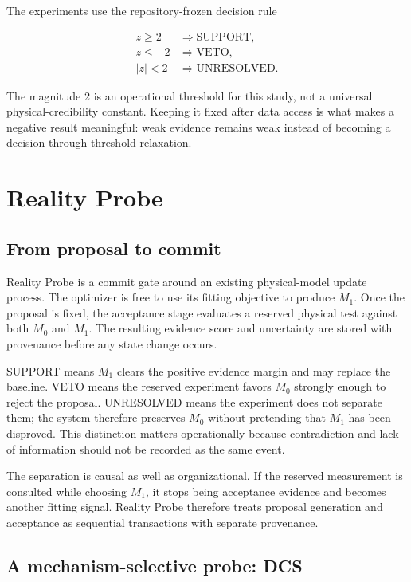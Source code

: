 \documentclass[acmtog]{acmart}
\begin{document}
The experiments use the repository-frozen decision rule

\[
\begin{aligned}
z \geq 2 &\Rightarrow \mathrm{SUPPORT},\\
z \leq -2 &\Rightarrow \mathrm{VETO},\\
|z|<2 &\Rightarrow \mathrm{UNRESOLVED}.
\end{aligned}
\]

The magnitude 2 is an operational threshold for this study, not a universal physical-credibility constant. Keeping it fixed after data access is what makes a negative result meaningful: weak evidence remains weak instead of becoming a decision through threshold relaxation.

\section{Reality Probe}\label{reality-probe}

\subsection{From proposal to commit}\label{captured-world-rewrite-and-verification-pipeline}

Reality Probe is a commit gate around an existing physical-model update process. The optimizer is free to use its fitting objective to produce \(M_1\). Once the proposal is fixed, the acceptance stage evaluates a reserved physical test against both \(M_0\) and \(M_1\). The resulting evidence score and uncertainty are stored with provenance before any state change occurs.

SUPPORT means \(M_1\) clears the positive evidence margin and may replace the baseline. VETO means the reserved experiment favors \(M_0\) strongly enough to reject the proposal. UNRESOLVED means the experiment does not separate them; the system therefore preserves \(M_0\) without pretending that \(M_1\) has been disproved. This distinction matters operationally because contradiction and lack of information should not be recorded as the same event.

The separation is causal as well as organizational. If the reserved measurement is consulted while choosing \(M_1\), it stops being acceptance evidence and becomes another fitting signal. Reality Probe therefore treats proposal generation and acceptance as sequential transactions with separate provenance.

\subsection{A mechanism-selective probe: DCS}\label{dark-field-counterfactual-spectroscopy}
\end{document}
